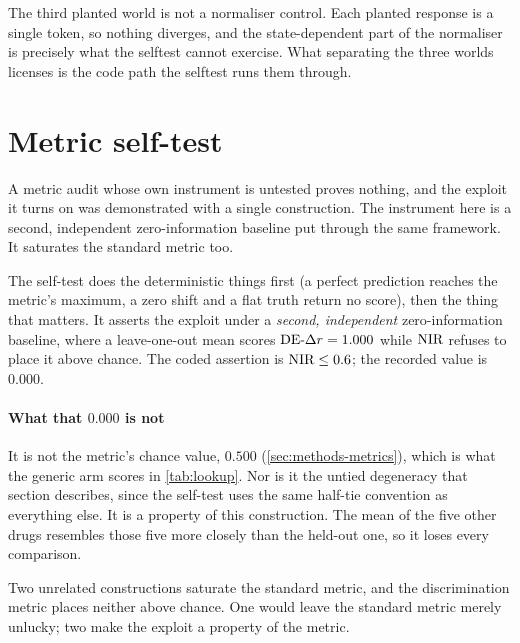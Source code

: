 \begin{scopelimit}
The third planted world is not a normaliser control. Each planted response is a
single token, so nothing diverges, and the state-dependent part of the
normaliser is precisely what the selftest cannot exercise. What separating the
three worlds licenses is the code path the selftest runs them through.
\end{scopelimit}

\section{Metric self-test}
\label{sec:app-selftest}

\begin{question}
A metric audit whose own instrument is untested proves nothing, and the exploit
it turns on was demonstrated with a single construction. The instrument here is
a second, independent zero-information baseline put through the same framework.
It saturates the standard metric too.
\end{question}

\noindent
The self-test does the deterministic things first (a perfect prediction reaches
the metric's maximum, a zero shift and a flat truth return no score), then the
thing that matters. It asserts the exploit under a \emph{second, independent}
zero-information baseline, where a leave-one-out mean scores $\textrm{DE-}\Delta r = 1.000$
while $\textrm{NIR}$ refuses to place it above chance. The coded assertion is
$\textrm{NIR} \leq 0.6$; the recorded value is $0.000$.

\paragraph{What that $0.000$ is not} It is not the metric's chance value,
$0.500$ (\cref{sec:methods-metrics}), which is what the generic arm scores in
\cref{tab:lookup}. Nor is it the untied degeneracy that
section describes, since the self-test uses the same half-tie convention as
everything else. It is a property of this construction. The mean of the five
other drugs resembles those five more closely than the held-out one, so it loses
every comparison.

Two unrelated constructions saturate the standard metric, and the discrimination
metric places neither above chance. One would leave the standard metric merely
unlucky; two make the exploit a property of the metric.
